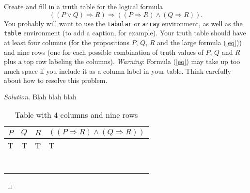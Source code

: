 \documentclass[12pt]{article}
\newenvironment{problem}[2][Problem]{\begin{trivlist}
\item[\hskip \labelsep {\bfseries #1}\hskip \labelsep {\bfseries #2.}]}{\end{trivlist}}
\newenvironment{solution}
               {\let\oldqedsymbol=\qedsymbol
                \renewcommand{\qedsymbol}{$\blacktriangleleft$}
                \begin{proof}[\textit\upshape Solution]}
               {\end{proof}
                \renewcommand{\qedsymbol}{\oldqedsymbol}}
\begin{document}
\begin{problem}{1}
Create and fill in a truth table for the logical formula
\begin{equation} \label{eq}
((P \vee Q) \Longrightarrow R) \Longrightarrow ((P \Longrightarrow R) \wedge (Q \Longrightarrow R)).
\end{equation}
You probably will want to use the \texttt{tabular} or \texttt{array} environment, as well as the \texttt{table} environment (to add a caption, for example).  Your truth table should have at least four columns (for the propositions $P$, $Q$, $R$ and the large formula (\ref{eq})) and nine rows (one for each possible combination of truth values of $P$, $Q$ and $R$ plus a top row labeling the columns).  \emph{Warning}:  Formula (\ref{eq}) may take up too much space if you include it as a column label in your table.  Think carefully about how to resolve this problem.
\end{problem}


\begin{solution} Blah blah blah
\newpage 

\begin{table}[t] %
	\centering
	\begin{tabular}{|c|r|c|l|} %
		\hline
		$P$ & $Q$ & $R$ &  $((P \Longrightarrow R) \wedge (Q \Longrightarrow R))$ \\
		\hline
		T & T & T & T\\
		\hline
		& & & \\
		\hline
		& & & \\
		\hline
		& & & \\
		\hline
		& & & \\
		\hline
		& & & \\
		\hline
		& & & \\
		\hline
		& & & \\
		\hline
	\end{tabular}
	\caption{Table with 4 columns and nine rows}
	\label{tab:truth1}
\end{table}

\end{solution}


 
 
\end{document}
